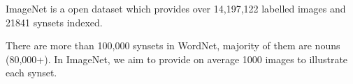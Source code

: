 \documentclass[../ImageClassifier.tex]{subfiles}
\begin{document}
    ImageNet is a open dataset which provides over 14,197,122 labelled images and 21841 synsets indexed. \parencite{imagenet}
    \begin{quoting}[begintext={``}, endtext={''\parencite{imagenet}}]
        There are more than 100,000 synsets in WordNet, majority of them are nouns (80,000+). In ImageNet, we aim to provide on average 1000 images to illustrate each synset.
    \end{quoting}
\end{document}

